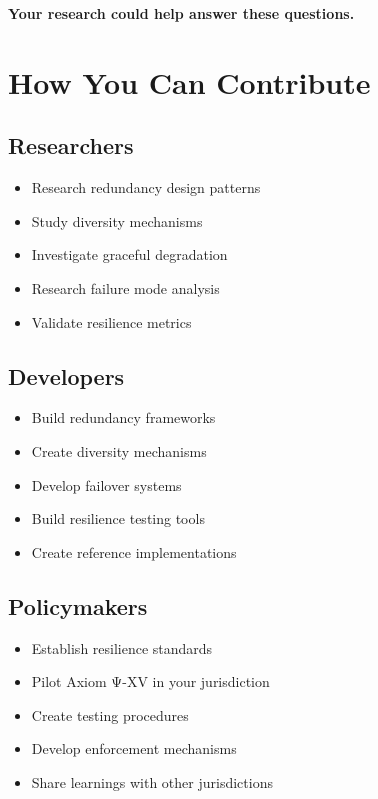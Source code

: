 \textbf{Your research could help answer these questions.}

\vspace{0.5cm}

\section{How You Can Contribute}

\subsection{Researchers}

\begin{itemize}
    \item Research redundancy design patterns
    \item Study diversity mechanisms
    \item Investigate graceful degradation
    \item Research failure mode analysis
    \item Validate resilience metrics
\end{itemize}

\subsection{Developers}

\begin{itemize}
    \item Build redundancy frameworks
    \item Create diversity mechanisms
    \item Develop failover systems
    \item Build resilience testing tools
    \item Create reference implementations
\end{itemize}

\subsection{Policymakers}

\begin{itemize}
    \item Establish resilience standards
    \item Pilot Axiom Ψ-XV in your jurisdiction
    \item Create testing procedures
    \item Develop enforcement mechanisms
    \item Share learnings with other jurisdictions
\end{itemize}

